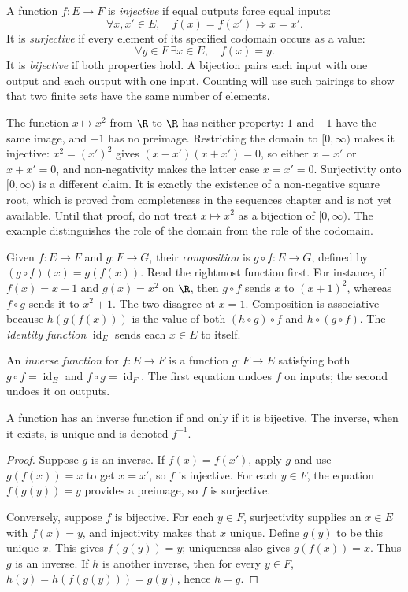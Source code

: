 A function $f:E\to F$ is \emph{injective} if equal outputs force equal inputs:
\[
\forall x,x'\in E,\quad f(x)=f(x')\Rightarrow x=x'.
\]
It is \emph{surjective} if every element of its specified codomain occurs as a value:
\[
\forall y\in F\ \exists x\in E,\quad f(x)=y.
\]
It is \emph{bijective} if both properties hold. A bijection pairs each input with
one output and each output with one input. Counting will use such pairings to
show that two finite sets have the same number of elements.

The function $x\mapsto x^2$ from $\R$ to $\R$ has neither property:
$1$ and $-1$ have the same image, and $-1$ has no preimage. Restricting the domain
to $[0,\infty)$ makes it injective: $x^2=(x')^2$ gives $(x-x')(x+x')=0$, so either
$x=x'$ or $x+x'=0$, and non-negativity makes the latter case $x=x'=0$. Surjectivity
onto $[0,\infty)$ is a different claim. It is exactly the existence of a non-negative
square root, which is proved from completeness in the sequences chapter and is not
yet available. Until that proof, do not treat $x\mapsto x^2$ as a bijection of
$[0,\infty)$. The example distinguishes the role of the domain from the role of the
codomain.

Given $f:E\to F$ and $g:F\to G$, their \emph{composition} is
$g\circ f:E\to G$, defined by $(g\circ f)(x)=g(f(x))$.
Read the rightmost function first. For instance, if $f(x)=x+1$ and $g(x)=x^2$
on $\R$, then $g\circ f$ sends $x$ to $(x+1)^2$, whereas $f\circ g$ sends it
to $x^2+1$. The two disagree at $x=1$. Composition is associative because
$h(g(f(x)))$ is the value of both $(h\circ g)\circ f$ and $h\circ(g\circ f)$.
The \emph{identity function} $\operatorname{id}_E$ sends each $x\in E$ to itself.

An \emph{inverse function} for $f:E\to F$ is a function $g:F\to E$ satisfying
both $g\circ f=\operatorname{id}_E$ and $f\circ g=\operatorname{id}_F$.
The first equation undoes $f$ on inputs; the second undoes it on outputs.

\begin{theorem}\label{thm:lang-inverse}
A function has an inverse function if and only if it is bijective.
The inverse, when it exists, is unique and is denoted $f^{-1}$.
\end{theorem}
\begin{proof}
Suppose $g$ is an inverse. If $f(x)=f(x')$, apply $g$ and use $g(f(x))=x$ to get
$x=x'$, so $f$ is injective. For each $y\in F$, the equation $f(g(y))=y$
provides a preimage, so $f$ is surjective.

Conversely, suppose $f$ is bijective. For each $y\in F$, surjectivity supplies an
$x\in E$ with $f(x)=y$, and injectivity makes that $x$ unique. Define $g(y)$ to
be this unique $x$. This gives $f(g(y))=y$; uniqueness also gives $g(f(x))=x$.
Thus $g$ is an inverse. If $h$ is another inverse, then for every $y\in F$,
$h(y)=h(f(g(y)))=g(y)$, hence $h=g$.
\end{proof}

